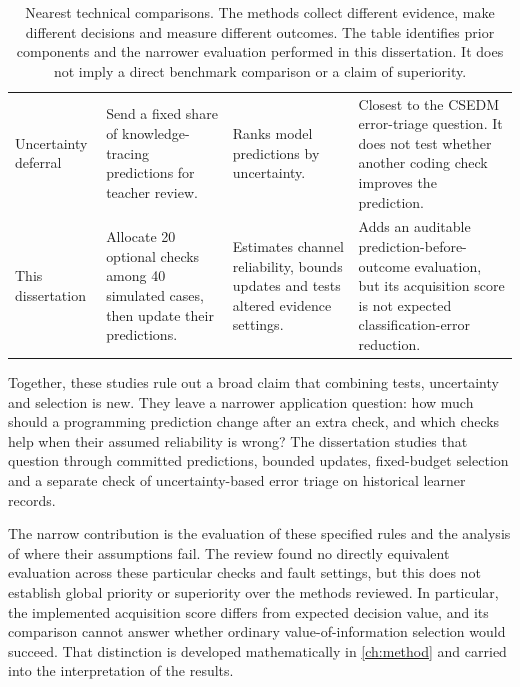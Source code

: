 \begin{table}[htbp]
\begin{tabularx}{\textwidth}{@{}>{\raggedright\arraybackslash}p{}>{\raggedright\arraybackslash}p{}>{\raggedright\arraybackslash}p{}>{\raggedright\arraybackslash}X@{}}
    \addlinespace
    Uncertainty deferral \parencite{mitton2026defer}
      & Send a fixed share of knowledge-tracing predictions for teacher review.
      & Ranks model predictions by uncertainty.
      & Closest to the CSEDM error-triage question. It does not test whether another coding check improves the prediction. \\
    \addlinespace
    This dissertation
      & Allocate 20 optional checks among 40 simulated cases, then update their predictions.
      & Estimates channel reliability, bounds updates and tests altered evidence settings.
      & Adds an auditable prediction-before-outcome evaluation, but its acquisition score is not expected classification-error reduction. \\
    \bottomrule
  \end{tabularx}
  \caption{Nearest technical comparisons. The methods collect different evidence, make different decisions and measure different
  outcomes. The table identifies prior components and the narrower evaluation performed in this dissertation. It does not imply
  a direct benchmark comparison or a claim of superiority.}
  \label{tab:nearest-work}
\end{table}

Together, these studies rule out a broad claim that combining tests, uncertainty and selection is new. They leave a narrower
application question: how much should a programming prediction change after an extra check, and which checks help when their
assumed reliability is wrong? The dissertation studies that question through committed predictions, bounded updates, fixed-budget
selection and a separate check of uncertainty-based error triage on historical learner records.

The narrow contribution is the evaluation of these specified rules and the analysis of where their assumptions fail.
The review found no directly equivalent evaluation across these particular checks and fault settings, but this does not
establish global priority or superiority over the methods reviewed. In particular, the implemented acquisition score differs
from expected decision value, and its comparison cannot answer whether ordinary value-of-information selection would succeed.
That distinction is developed mathematically in \cref{ch:method} and carried into the interpretation of the results.
